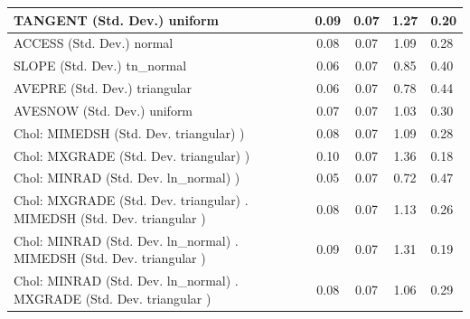 \begin{table}
\begin{center}
\begin{tabular}{|l|l|c|c|c|l|}
			\hline
			TANGENT (Std. Dev.) uniform &  & 0.09 & 0.07 & 1.27 & 0.20 \\
			\hline
			ACCESS (Std. Dev.) normal &  & 0.08 & 0.07 & 1.09 & 0.28 \\
			\hline
			SLOPE (Std. Dev.) tn_normal &  & 0.06 & 0.07 & 0.85 & 0.40 \\
			\hline
			AVEPRE (Std. Dev.) triangular &  & 0.06 & 0.07 & 0.78 & 0.44 \\
			\hline
			AVESNOW (Std. Dev.) uniform &  & 0.07 & 0.07 & 1.03 & 0.30 \\
			\hline
			 Chol: MIMEDSH (Std. Dev. triangular) ) &  & 0.08 & 0.07 & 1.09 & 0.28 \\
			\hline
			 Chol: MXGRADE (Std. Dev. triangular) ) &  & 0.10 & 0.07 & 1.36 & 0.18 \\
			\hline
			 Chol: MINRAD (Std. Dev. ln_normal) ) &  & 0.05 & 0.07 & 0.72 & 0.47 \\
			\hline
			 Chol: MXGRADE (Std. Dev. triangular) . MIMEDSH (Std. Dev.   triangular ) &  & 0.08 & 0.07 & 1.13 & 0.26 \\
			\hline
			 Chol: MINRAD (Std. Dev. ln_normal) . MIMEDSH (Std. Dev.   triangular ) &  & 0.09 & 0.07 & 1.31 & 0.19 \\
			\hline
			 Chol: MINRAD (Std. Dev. ln_normal) . MXGRADE (Std. Dev.   triangular ) &  & 0.08 & 0.07 & 1.06 & 0.29 \\
			\hline
		\end{tabular}
	\end{center}
\end{table}